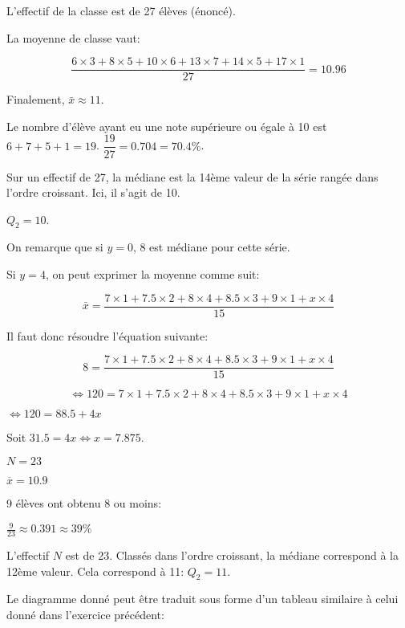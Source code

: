 \documentclass[a4paper,12pt]{scrartcl}
\begin{document}
\question{}
L'effectif de la classe est de 27 élèves (énoncé).

La moyenne de classe vaut: 

$$\dfrac{6 \times 3 + 8 \times 5 + 10 \times 6 + 13 \times 7 + 14 \times 5 + 17 \times 1}{27} = 10.96$$

Finalement, $\bar{x} \approx 11$.

\question{}
Le nombre d'élève ayant eu une note supérieure ou égale à 10 est $6+7+5+1 = 19$. $\dfrac{19}{27} = 0.704 = 70.4\%$.

\question{}
Sur un effectif de 27, la médiane est la 14ème valeur de la série rangée dans l'ordre croissant. Ici, il s'agit de 10.

$Q_2 = 10$.

\exo{}

\question{}
On remarque que si $y = 0$, 8 est médiane pour cette série.

\question{}
Si $y=4$, on peut exprimer la moyenne comme suit:

$$\bar{x} = \dfrac{7 \times 1 + 7.5 \times 2 + 8 \times 4 + 8.5 \times 3 + 9 \times 1 + x \times 4}{15}$$

Il faut donc résoudre l'équation suivante:

$$8 = \dfrac{7 \times 1 + 7.5 \times 2 + 8 \times 4 + 8.5 \times 3 + 9 \times 1 + x \times 4}{15}$$

$$\Leftrightarrow 120 = 7 \times 1 + 7.5 \times 2 + 8 \times 4 + 8.5 \times 3 + 9 \times 1 + x \times 4$$

$\Leftrightarrow 120 = 88.5 + 4x$

Soit $31.5 = 4x \Leftrightarrow x = 7.875$.


$N = 23$

$\overline{x} = 10.9$


9 élèves ont obtenu 8 ou moins: 

$\frac{9}{23} \approx 0.391 \approx 39\%$


L'effectif $N$ est de 23. Classés dans l'ordre croissant, la médiane correspond à la 12ème valeur. Cela correspond à 11: $Q_2 = 11$.


\question{}
Le diagramme donné peut être traduit sous forme d'un tableau similaire à celui donné dans l'exercice précédent:
\end{document}
